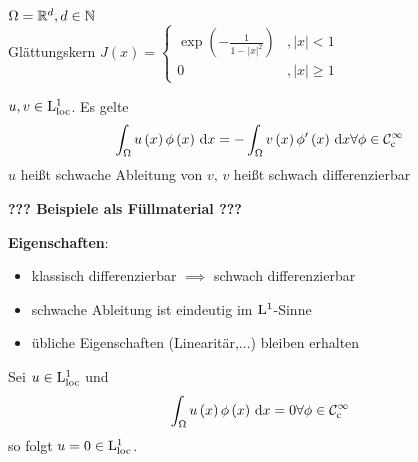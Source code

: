 \begin{expl}
	$\Omega=\mathbb{R}^{d},d\in\mathbb{N}$\\
	Glättungskern $J\left(x\right)=\begin{cases}
		\operatorname{exp}\left(-\frac{1}{1-|x|^{2}}\right) &, |x| < 1\\
		0 &, |x| \geq 1
	\end{cases}$
\end{expl}

\begin{definition}
	$u,v\in\mathrm{L}^{1}_{\text{loc}}$. Es gelte
	\begin{equation*}
		\int_{\Omega}u\left(x\right)\phi\left(x\right)\,\mathrm{d}x = -\int_{\Omega}v\left(x\right)\phi^{\prime}\left(x\right)\,\mathrm{d}x \forall\phi\in\mathcal{C}^{\infty}_{\text{c}}
	\end{equation*}
	$u$ heißt schwache Ableitung von $v$, $v$ heißt schwach differenzierbar
\end{definition}

\textbf{??? Beispiele als Füllmaterial ???}

\textbf{Eigenschaften}:
\begin{itemize}
	\item klassisch differenzierbar $\implies$ schwach differenzierbar
	\item schwache Ableitung ist eindeutig im $\mathrm{L}^{1}$-Sinne
	\item übliche Eigenschaften (Linearitär,...) bleiben erhalten
\end{itemize}

\begin{lemma}
	Sei $u\in\mathrm{L}^{1}_{\text{loc}}$ und
	\begin{equation*}
		\int_{\Omega}u\left(x\right)\phi\left(x\right)\,\mathrm{d}x = 0 \forall\phi\in\mathcal{C}^{\infty}_{\text{c}}
	\end{equation*}
	so folgt $u=0\in\mathrm{L}^{1}_{\text{loc}}$.
\end{lemma}

